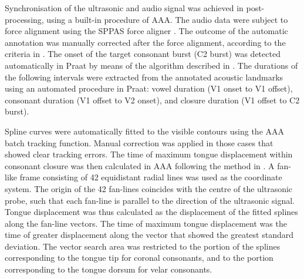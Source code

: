 \documentclass[authoryear, twocolumn]{elsarticle}
\begin{document}
Synchronisation of the ultrasonic and audio signal was achieved in
post-processing, using a built-in procedure of AAA. The audio data were
subject to force alignment using the SPPAS force aligner
\citep{bigi2015}. The outcome of the automatic annotation was manually
corrected after the force alignment, according to the criteria in
. The onset of the target consonant burst (C2
burst) was detected automatically in Praat \citep{boersma2016} by means
of the algorithm described in \citet{ananthapadmanabha2014}. The
durations of the following intervals were extracted from the annotated
acoustic landmarks using an automated procedure in Praat: vowel duration
(V1 onset to V1 offset), consonant duration (V1 offset to V2 onset), and
closure duration (V1 offset to C2 burst).


Spline curves were automatically fitted to the visible contours using
the AAA batch tracking function. Manual correction was applied in those
cases that showed clear tracking errors. The time of maximum tongue
displacement within consonant closure was then calculated in AAA
following the method in \citet{strycharczuk2015}. A fan-like frame
consisting of 42 equidistant radial lines was used as the coordinate
system. The origin of the 42 fan-lines coincides with the centre of the
ultrasonic probe, such that each fan-line is parallel to the direction
of the ultrasonic signal. Tongue displacement was thus calculated as the
displacement of the fitted splines along the fan-line vectors. The time
of maximum tongue displacement was the time of greater displacement
along the vector that showed the greatest standard deviation. The vector
search area was restricted to the portion of the splines corresponding
to the tongue tip for coronal consonants, and to the portion
corresponding to the tongue dorsum for velar consonants.
\end{document}
